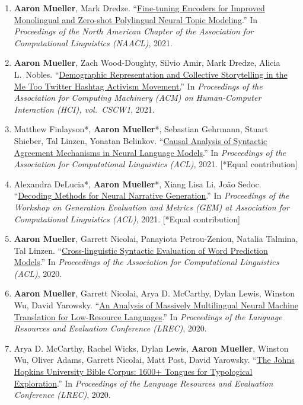 \documentclass[10pt]{article}
\providecommand*\titlelink[2]{\href{#1}{\textcolor{accent}{#2}}}
\begin{document}
\begin{enumerate}[leftmargin=*, topsep=0pt, itemsep=0.25ex, partopsep=0ex, parsep=1ex]
	\item \textbf{Aaron Mueller}, Mark Dredze. ``\titlelink{https://aclanthology.org/2021.naacl-main.243/}{Fine-tuning Encoders for Improved Monolingual and Zero-shot Polylingual Neural Topic Modeling}.'' In \emph{Proceedings of the North American Chapter of the Association for Computational Linguistics (NAACL)}, 2021.  
	
	\item \textbf{Aaron Mueller}, Zach Wood-Doughty, Silvio Amir, Mark Dredze, Alicia L.\ Nobles. ``\titlelink{https://dl.acm.org/doi/10.1145/3449181}{Demographic Representation and Collective Storytelling in the Me Too Twitter Hashtag Activism Movement.}'' In \emph{Proceedings of the Association for Computing Machinery (ACM) on Human-Computer Interaction (HCI), vol.\ CSCW1}, 2021.

	\item Matthew Finlayson*, \textbf{Aaron Mueller}*, Sebastian Gehrmann, Stuart Shieber, Tal Linzen, Yonatan Belinkov. ``\titlelink{https://aclanthology.org/2021.acl-long.144/}{Causal Analysis of Syntactic Agreement Mechanisms in Neural Language Models}.'' In \emph{Proceedings of the Association for Computational Linguistics (ACL)}, 2021. [*Equal contribution]\label{pub:causal}
	
	\item Alexandra DeLucia*, \textbf{Aaron Mueller}*, Xiang Lisa Li, João Sedoc. ``\titlelink{https://aclanthology.org/2021.gem-1.16/}{Decoding Methods for Neural Narrative Generation}.'' In \emph{Proceedings of the Workshop on Generation Evaluation and Metrics (GEM) at Association for Computational Linguistics (ACL)}, 2021. [*Equal contribution]

	\item \textbf{Aaron Mueller}, Garrett Nicolai, Panayiota Petrou-Zeniou, Natalia Talmina, Tal Linzen. ``\titlelink{https://aclanthology.org/2020.acl-main.490/}{Cross-linguistic Syntactic Evaluation of Word Prediction Models}.'' In \emph{Proceedings of the Association for Computational Linguistics (ACL)}, 2020.

	\item \textbf{Aaron Mueller}, Garrett Nicolai, Arya D. McCarthy, Dylan Lewis, Winston Wu, David Yarowsky. ``\titlelink{https://aclanthology.org/2020.lrec-1.458/}{An Analysis of Massively Multilingual Neural Machine Translation for Low-Resource Languages}.'' In \emph{Proceedings of the Language Resources and Evaluation Conference (LREC)}, 2020.

	\item Arya D. McCarthy, Rachel Wicks, Dylan Lewis, \textbf{Aaron Mueller}, Winston Wu, Oliver Adams, Garrett Nicolai, Matt Post, David Yarowsky. ``\titlelink{https://aclanthology.org/2020.lrec-1.352/}{The Johns Hopkins University Bible Corpus: 1600+ Tongues for Typological Exploration}.'' In \emph{Proceedings of the Language Resources and Evaluation Conference (LREC)}, 2020.


\end{enumerate}
\end{document}
